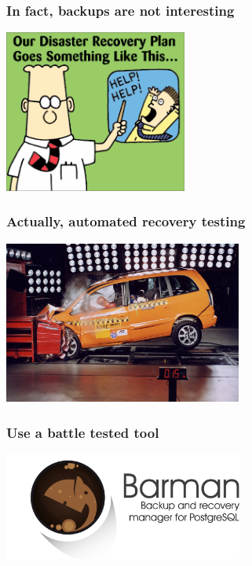 \documentclass{beamer}
\begin{document}
\begin{frame}
  \frametitle{In fact, backups are not interesting}

  \begin{center}
    \includegraphics[height=2.1in]{our_disaster_recovery_plan.png}
  \end{center}
\end{frame}

\begin{frame}
  \frametitle{Actually, automated recovery testing}

  \begin{center}
    \includegraphics[height=2.1in]{crash-test.jpg}
  \end{center}
\end{frame}

\begin{frame}
  \frametitle{Use a battle tested tool}

  
  \begin{center}
    \includegraphics[height=1.4in]{pgbarman.png}
  \end{center}
\end{frame}
\end{document}

